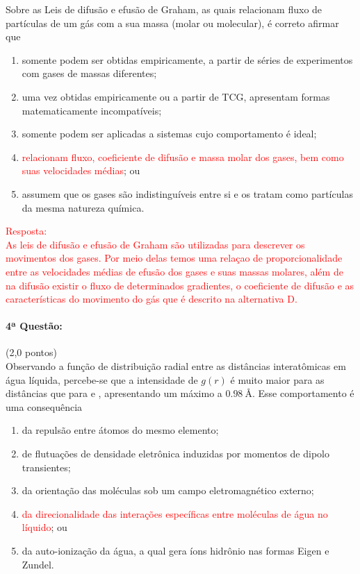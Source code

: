 \documentclass[12pt,a4paper]{article}
\begin{document}
Sobre as Leis de difusão e efusão de Graham, as quais relacionam 
fluxo de partículas de um gás com a sua massa (molar ou molecular), 
é correto afirmar que 
\begin{enumerate}[label = (\alph*)]
    \item somente podem ser obtidas empiricamente, a partir de séries de experimentos com gases de massas diferentes;
    \item uma vez obtidas empiricamente ou a partir de TCG, apresentam formas matematicamente incompatíveis;
    \item somente podem ser aplicadas a sistemas cujo comportamento é ideal; 
    \item \textcolor{red}{relacionam fluxo, coeficiente de difusão e massa molar dos gases, bem como suas velocidades médias}; ou
    \item assumem que os gases são indistinguíveis entre si e os tratam como partículas da mesma natureza química. \\    
\end{enumerate}

\textcolor{red}{Resposta: \\
As leis de difusão e efusão de Graham são utilizadas para descrever os movimentos dos gases. Por meio delas temos uma relaçao de proporcionalidade entre as velocidades médias de efusão dos gases e suas massas molares, além de na difusão existir o fluxo de determinados gradientes, o coeficiente de difusão e as características do movimento do gás que é descrito na alternativa D.} \\ [0.5cm]


\paragraph{4ª Questão:} (2,0 pontos) \\ [0.5cm]


Observando a função de distribuição radial entre as distâncias interatômicas em água líquida, percebe-se que a intensidade de $g(r)$ é muito maior para as 
distâncias  que para  e , apresentando um máximo a $\SI{0,98}{ \angstrom}$. Esse comportamento é uma consequência

\begin{enumerate}[label = (\alph*)]
    \item da repulsão entre átomos do mesmo elemento;
    \item de flutuações de densidade eletrônica induzidas por momentos de dipolo transientes;
    \item da orientação das moléculas sob um campo eletromagnético externo;
    \item \textcolor{red}{da direcionalidade das interações específicas entre moléculas de água no líquido}; ou
    \item da auto-ionização da água, a qual gera íons hidrônio nas formas Eigen e Zundel. \\ 
    
\end{enumerate}
\end{document}
